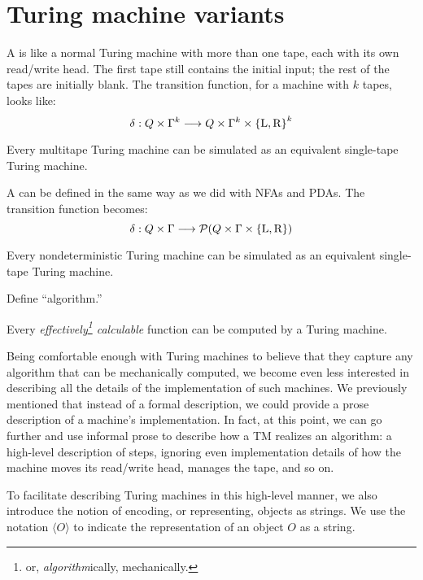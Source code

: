 \documentclass[twoside,letterpaper,openany]{book}
\begin{document}
\section{Turing machine variants}

\begin{defn}
A  is like a normal Turing machine with more than one tape, each with its own read/write head. The first tape still contains the initial input; the rest of the tapes are initially blank. The transition function, for a machine with $k$ tapes, looks like:
\[ \delta : Q \times \Gamma^k \longrightarrow Q \times \Gamma^k \times \left\lbrace \textrm{L}, \textrm{R} \right\rbrace^k \]
\end{defn}

\begin{stmt}
Every multitape Turing machine can be simulated as an equivalent single-tape Turing machine.
\end{stmt}

\begin{defn}
A  can be defined in the same way as we did with NFAs and PDAs. The transition function becomes:
\[ \delta : Q \times \Gamma \longrightarrow \mathcal{P}(Q \times \Gamma \times \left\lbrace \textrm{L}, \textrm{R} \right\rbrace) \]
\end{defn}

\begin{stmt}
Every nondeterministic Turing machine can be simulated as an equivalent single-tape Turing machine.
\end{stmt}

\begin{exer}
Define ``algorithm.''
\end{exer}

\begin{conjecture}
Every \emph{effectively\footnote{or, \emph{algorithm}ically, mechanically.} calculable} function can be computed by a Turing machine.
\end{conjecture}
 
 \clearpage
 
\newcommand\repof[1]{{\langle{#1}\rangle}}

\begin{discussion}
Being comfortable enough with Turing machines to believe that they capture any algorithm that can be mechanically computed, we become even less interested in describing all the details of the implementation of such machines. We previously mentioned that instead of a formal description, we could provide a prose description of a machine's implementation. In fact, at this point, we can go further and use informal prose to describe how a TM realizes an algorithm: a high-level description of steps, ignoring even implementation details of how the machine moves its read/write head, manages the tape, and so on.

To facilitate describing Turing machines in this high-level manner, we also introduce the notion of encoding, or representing, objects as strings. We use the notation $\repof O$ to indicate the representation of an object $O$ as a string.
\end{discussion}
\end{document}
